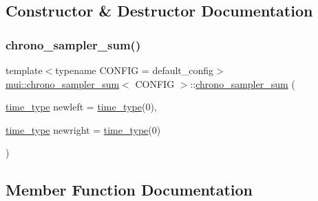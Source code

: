 \subsection{Constructor \& Destructor Documentation}
\mbox{\label{classmui_1_1chrono__sampler__sum_a6422f7fbef2d39c191eb56a8b167df46}} 
\subsubsection{\texorpdfstring{chrono\+\_\+sampler\+\_\+sum()}{chrono\_sampler\_sum()}}
{\footnotesize\ttfamily template$<$typename C\+O\+N\+F\+IG  = default\+\_\+config$>$ \\
\hyperlink{classmui_1_1chrono__sampler__sum}{mui\+::chrono\+\_\+sampler\+\_\+sum}$<$ C\+O\+N\+F\+IG $>$\+::\hyperlink{classmui_1_1chrono__sampler__sum}{chrono\+\_\+sampler\+\_\+sum} (\begin{DoxyParamCaption}\item[{\hyperlink{classmui_1_1chrono__sampler__sum_ada1a39bc0845e79c00e7aed8b55e8fb2}{time\+\_\+type}}]{newleft = {\ttfamily \hyperlink{classmui_1_1chrono__sampler__sum_ada1a39bc0845e79c00e7aed8b55e8fb2}{time\+\_\+type}(0)},  }\item[{\hyperlink{classmui_1_1chrono__sampler__sum_ada1a39bc0845e79c00e7aed8b55e8fb2}{time\+\_\+type}}]{newright = {\ttfamily \hyperlink{classmui_1_1chrono__sampler__sum_ada1a39bc0845e79c00e7aed8b55e8fb2}{time\+\_\+type}(0)} }\end{DoxyParamCaption})\hspace{0.3cm}{\ttfamily [inline]}}



\subsection{Member Function Documentation}
\mbox{\label{classmui_1_1chrono__sampler__sum_a1c018603cc6587c48996a89de0871a0f}} 
